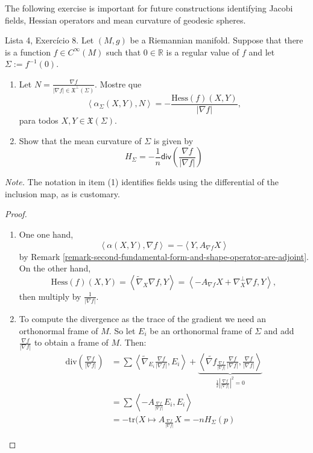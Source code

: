 The following exercise is important for future constructions identifying Jacobi
fields, Hessian operators and mean curvature of geodesic spheres.

\begin{exercise}
\label{exercise-mean-curvature}
Lista 4, Exercício 8. Let $(M,g)$ be a Riemannian manifold. Suppose that there
is a function $f \in C^\infty(M)$ such that $0 \in \mathbb{R}$ is a regular
value of $f$ and let $\Sigma:=f^{-1}(0)$.
\begin{enumerate}
\item Let $N=\frac{\nabla f}{|\nabla f| \in \mathfrak{X}^\perp(\Sigma)}$. Mostre
que
$$
\left<\alpha_{\Sigma}(X,Y),N\right>=-\frac{\text{Hess}(f)(X,Y)}{|\nabla f|},
$$
para todos $X,Y \in \mathfrak{X}(\Sigma)$.

\item Show that the mean curvature of $\Sigma$ is given by
$$
H_{\Sigma}=-\frac{1}{n}\mathsf{div}\left(\frac{\nabla f}{|\nabla f|}\right)
$$
\end{enumerate}
{\it Note.} The notation in item (1) identifies fields using the differential of
the inclusion map, as is customary.
\end{exercise}

\begin{proof}
\begin{enumerate}
\item One one hand,
 $$
\left<\alpha(X,Y),\nabla f\right>=-\left<Y,A_{\nabla f}X\right>
$$
by Remark \ref{remark-second-fundamental-form-and-shape-operator-are-adjoint}.
On the other hand,
$$
\text{Hess}(f)(X,Y)=\left<\tilde{\nabla}_X \nabla f,Y\right>=
\left<-A_{\nabla f}X+\nabla_X^\perp \nabla f,Y\right>,
$$
then multiply by $\frac{1}{|\nabla f|}$.

\item To compute the divergence as the trace of the gradient we need an
orthonormal frame of $M$. So let $E_i$ be an orthonormal frame of $\Sigma$ and
add $\frac{\nabla f}{|\nabla f|}$ to obtain a frame of $M$. Then:
\begin{align*}
\text{div}\left(\frac{\nabla f}{|\nabla f|}\right)&=\sum
\left<\tilde{\nabla}_{E_i}\frac{\nabla f}{|\nabla
f|},E_i\right>+\underbrace{\left<\tilde{\nabla f}_{\frac{\nabla f}{|\nabla
f|}}\frac{\nabla f}{|\nabla f|},\frac{\nabla f}{|\nabla
f|}\right>}_{\frac{1}{2}\left|\frac{\nabla f}{|\nabla f|}\right|^2=0}\\
&=\sum \left<-A_{\frac{\nabla f}{|\nabla f|}}E_i,E_i\right>\\
&=-\text{tr}(X \mapsto A_{\frac{\nabla f}{|\nabla f|}}X=-nH_{\Sigma}(p)
\end{align*}

\end{enumerate}
\end{proof}

